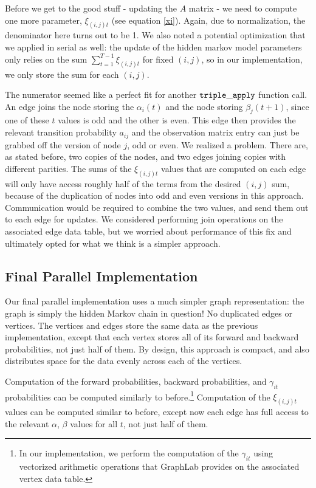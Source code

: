 Before we get to the good stuff - updating the $A$ matrix - we need to compute one more parameter, $\xi_{(i,j)t}$ (see equation \ref{xi}).
Again, due to normalization, the denominator here turns out to be 1.  We also noted a potential optimization that we applied in serial as well: the update of the hidden markov model parameters only relies on the sum $\sum_{t = 1}^{T-1} \xi_{(i,j)t} $ for fixed $(i, j)$, so in our implementation, we only store the sum for each $(i, j)$.

The numerator seemed like a perfect fit for another $\tt{triple\_apply}$ function call.  An edge joins the node storing the $\alpha_{i}(t)$ and the node storing $\beta_{j}(t+1)$, since one of these $t$ values is odd and the other is even.  This edge then provides the relevant transition probability $a_{ij}$ and the observation matrix entry can just be grabbed off the version of node $j$, odd or even.  We realized a problem. There are, as stated before, two copies of the nodes, and two edges joining copies with different parities.  The sums of the $\xi_{(i,j)t}$ values that are computed on each edge will only have access roughly half of the terms from the desired $(i, j)$ sum, because of the duplication of nodes into odd and even versions in this approach.  Communication would be required to combine the two values, and send them out to each edge for updates.  We considered performing join operations on the associated edge data table, but we worried about performance of this fix and ultimately opted for what we think is a simpler approach.

\subsection{Final Parallel Implementation}

Our final parallel implementation uses a much simpler graph representation: the graph is simply the hidden Markov chain in question! No duplicated edges or vertices.  The vertices and edges store the same data as the previous implementation, except that each vertex stores all of its forward and backward probabilities, not just half of them.  By design, this approach is compact, and also distributes space for the data evenly across each of the vertices.

Computation of the forward probabilities, backward probabilities, and $\gamma_{it}$ probabilities can be computed similarly to before.\footnote{In our implementation, we perform the computation of the $\gamma_{it}$ using vectorized arithmetic operations that GraphLab provides on the associated vertex data table.}  Computation of the $\xi_{(i, j)t}$ values can be computed similar to before, except now each edge has full access to the relevant $\alpha$, $\beta$ values for all $t$, not just half of them.

